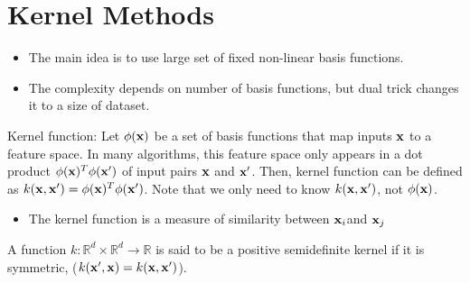 \chapter{Kernel Methods}
\begin{itemize}
	\item The main idea is to use large set of fixed non-linear basis functions.
	\item The complexity depends on number of basis functions, but dual trick changes it to a size of dataset. 
\end{itemize}

Kernel function: Let $\phi({\mathbf{x}})$ be a set of basis functions that map inputs ${\mathbf{x}}$ to a feature space. In many algorithms, this feature space only appears in a dot product $\phi({\mathbf{x}})^T\phi({\mathbf{x}}')$ of input pairs ${\mathbf{x}}$ and ${\mathbf{x}}'$. Then, kernel function can be defined as $k({\mathbf{x}}, {\mathbf{x}}') = \phi({\mathbf{x}})^T\phi({\mathbf{x}}')$. Note that we only need to know $k({\mathbf{x}}, {\mathbf{x}}')$, not $\phi({\mathbf{x}})$.
\begin{itemize}
	\item The kernel function is a measure of similarity between ${\mathbf{x}}_i$and ${\mathbf{x}}_j$ 
\end{itemize}

A function $k: \mathbb{R}^d\times \mathbb{R}^d\to \mathbb{R}$ is said to be a positive semidefinite kernel if it is symmetric, (\ie $k({\mathbf{x}}',{\mathbf{x}})= k({\mathbf{x}},{\mathbf{x}}')$).

